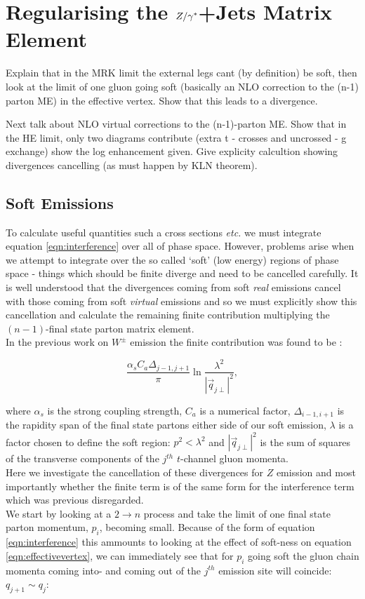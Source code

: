 	\section{Regularising the ${Z/\gamma^*}$+Jets Matrix Element}
	\label{sec:regularising}

		Explain that in the MRK limit the external legs cant (by definition) be soft, then look at the limit of one gluon going soft (basically an NLO correction to the (n-1) parton ME) in the effective vertex.  Show that this leads to a divergence.

		Next talk about NLO virtual corrections to the (n-1)-parton ME.  Show that in the HE limit, only two diagrams contribute (extra t - crosses and uncrossed - g exchange) show the log enhancement given.  Give explicity calcultion showing divergences cancelling (as must happen by KLN theorem).

		\subsection{Soft Emissions}
		\label{sub:subsection_name}

			To calculate useful quantities such a cross sections \emph{etc.} we must integrate equation \ref{eqn:interference} over all of phase space.  However, problems arise when we attempt to integrate over the so called `soft' (low energy) regions of phase space - things which should be finite diverge and need to be cancelled carefully.  It is well understood that the divergences coming from soft \emph{real} emissions cancel with those coming from soft \emph{virtual} emissions and so we must explicitly show this cancellation and calculate the remaining finite contribution multiplying the $(n-1)$-final state parton matrix element.\\In the previous work on $W^\pm$ emission the finite contribution was found to be \cite{JeppeHiggs}\cite{Constructing}:

			\begin{equation}
			\frac{\alpha_s C_a \Delta_{j-1, j+1}}{\pi}\ln{\frac{\lambda^2}{|\vec{q}_{j\perp}|^2}},
			\end{equation}

			where $\alpha_s$ is the strong coupling strength, $C_a$ is a numerical factor, $\Delta_{i-1, i+1}$ is the rapidity span of the final state partons either side of our soft emission, $\lambda$ is a factor chosen to define the soft region: $p^2 < \lambda^2$ and $|\vec{q}_{j\perp}|^2$ is the sum of squares of the transverse components of the $j^{th}$ $t$-channel gluon momenta.\\Here we investigate the cancellation of these divergences for $Z$ emission and most importantly whether the finite term is of the same form for the interference term which was previous disregarded.\\We start by looking at a $2\rightarrow n$ process and take the limit of one final state parton momentum, $p_i$, becoming small.  Because of the form of equation \ref{eqn:interference} this ammounts to looking at the effect of soft-ness on equation \ref{eqn:effectivevertex}, we can immediately see that for $p_i$ going soft the gluon chain momenta coming into- and coming out of the $j^{th}$ emission site will coincide: $q_{j+1}\sim q_j$:

